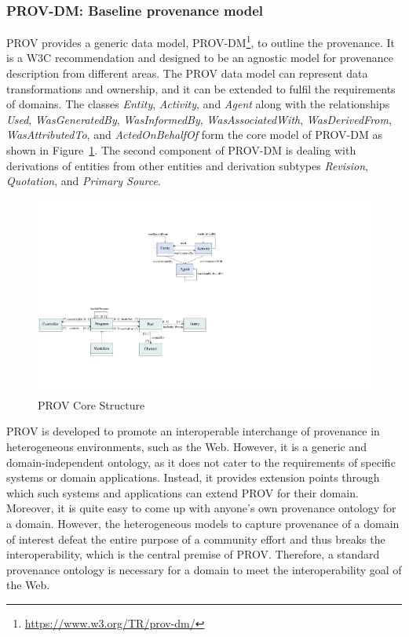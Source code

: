 \documentclass[ao]{iosart2x}
\begin{document}
\subsubsection{PROV-DM: Baseline provenance model}
\label{subsec:prov-dm}

PROV provides a generic data model, PROV-DM\footnote{\url{https://www.w3.org/TR/prov-dm/}}, to outline the provenance.
It is a W3C recommendation and designed to be an agnostic model for provenance description from different areas. 
The PROV data model can represent data transformations and ownership, and it can be extended to fulfil the requirements of domains.
The classes \textit{Entity}, \textit{Activity}, and \textit{Agent} along with the relationships \textit{Used}, \textit{WasGeneratedBy}, \textit{WasInformedBy}, \textit{WasAssociatedWith}, \textit{WasDerivedFrom},
\textit{WasAttributedTo}, and \textit{ActedOnBehalfOf} form the core model of PROV-DM as shown in Figure~\ref{fig:prov-dm}.
The second component of PROV-DM is dealing with derivations of entities from other entities and derivation subtypes \textit{Revision}, \textit{Quotation}, and \textit{Primary Source}. 

\begin{figure}[h]
    \centering
    \includegraphics[width=0.5\linewidth]{figures/prov-o.pdf}
    \caption{PROV Core Structure}
    \label{fig:prov-dm}
\end{figure}

PROV is developed to promote an interoperable interchange of provenance in heterogeneous environments, such as the Web. However, it is a generic and domain-independent ontology, as it does not cater to the requirements of specific systems or domain applications. Instead, it provides extension points through which such systems and applications can extend PROV for their domain. Moreover, it is quite easy to come up with anyone’s own provenance ontology for a domain. However, the heterogeneous models to capture provenance of a domain of interest defeat the entire purpose of a community effort and thus breaks the interoperability, which is the central premise of PROV. Therefore, a standard provenance ontology is necessary for a domain to meet the interoperability goal of the Web. 
\end{document}
